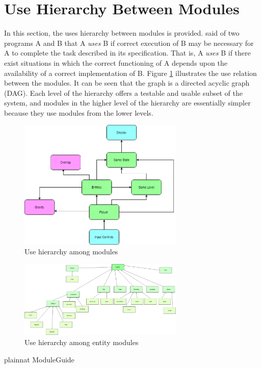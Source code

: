 \documentclass[12pt, titlepage]{article}
\begin{document}
\section{Use Hierarchy Between Modules} \label{SecUse}

In this section, the uses hierarchy between modules is
provided. \citet{Parnas1978} said of two programs A and B that A {\em uses} B if
correct execution of B may be necessary for A to complete the task described in
its specification. That is, A {\em uses} B if there exist situations in which
the correct functioning of A depends upon the availability of a correct
implementation of B.  Figure \ref{FigUH} illustrates the use relation between
the modules. It can be seen that the graph is a directed acyclic graph
(DAG). Each level of the hierarchy offers a testable and usable subset of the
system, and modules in the higher level of the hierarchy are essentially simpler
because they use modules from the lower levels.

\begin{figure}[H]
\centering
\includegraphics[width=0.7\textwidth]{UsesHierarchy.png}
\caption{Use hierarchy among modules}
\label{FigUH}
\end{figure}

\begin{figure}[H]
\centering
\includegraphics[width=0.7\textwidth]{entities.png}
\caption{Use hierarchy among entity modules}
\label{FigUHE}
\end{figure}


 {plainnat}
 {ModuleGuide}
\end{document}

